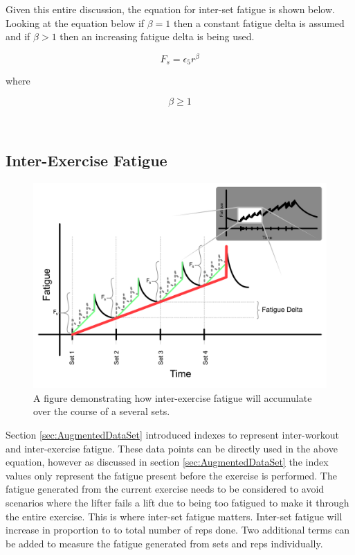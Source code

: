 Given this entire discussion, the equation for inter-set fatigue is shown below. Looking at the equation below if $\beta=1$ then a constant fatigue delta is assumed and if $\beta>1$ then an increasing fatigue delta is being used.

\begin{minipage}{\textwidth}
	\begin{equation}
		\label{eq:P2C1_InterSetFatigue}
		F_s = \epsilon_5 r ^ \beta
	\end{equation}
	\centerline{where}
	\begin{equation*}
	    \beta \ge 1
	\end{equation*}
\end{minipage}\\

\subsection{Inter-Exercise Fatigue}
\label{sec:P2C1_InterSetFatigue}

\begin{figure}[htb]
    \centering
    \includegraphics[scale=0.55]{images/p2/ch1/InterExerciseFatigue.png}
    \caption{A figure demonstrating how inter-exercise fatigue will accumulate over the course of a several sets.}
    \label{fig:P2C1_InterExerciseFatigue}
\end{figure}




Section \ref{sec:AugmentedDataSet} introduced indexes to represent inter-workout and inter-exercise fatigue. These data points can be directly used in the above equation, however as discussed in section \ref{sec:AugmentedDataSet} the index values only represent the fatigue present before the exercise is performed. The fatigue generated from the current exercise needs to be considered to avoid scenarios where the lifter fails a lift due to being too fatigued to make it through the entire exercise. This is where inter-set fatigue matters. Inter-set fatigue will increase in proportion to to total number of reps done. Two additional terms can be added to measure the fatigue generated from sets and reps individually.

